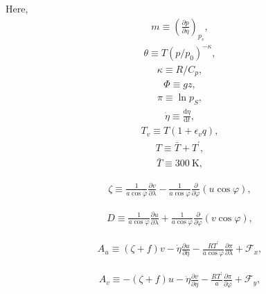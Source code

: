 Here, \begin{eqnarray}
m \equiv  \left(\frac{\partial p}{\partial \eta}\right)_{p_s},
\end{eqnarray} \begin{eqnarray}
\theta  \equiv   T \left( p/p_{0} \right)^{-\kappa},
\end{eqnarray} \begin{eqnarray}
\kappa  \equiv   R/C_{p},
\end{eqnarray} \begin{eqnarray}
\Phi  \equiv   gz,
\end{eqnarray} \begin{eqnarray}
\pi  \equiv   \ln p_{S},
\end{eqnarray} \begin{eqnarray}
\dot{\eta}  \equiv    \frac{\mathrm{d}\eta}{\mathrm{d}t},
\end{eqnarray} \begin{eqnarray}
T_v  \equiv   T ( 1+\epsilon_v q ),
\end{eqnarray} \begin{eqnarray}
T  \equiv   \bar{T} + T^{\prime},
\end{eqnarray} \begin{eqnarray}
\bar{T} \equiv 300 \ \mathrm{K},
\end{eqnarray}

\begin{eqnarray}
  \zeta  \equiv  \frac{1}{a \cos\varphi }
  \frac{\partial v}{\partial \lambda}
    -  \frac{1}{a \cos\varphi }
  \frac{\partial }{\partial \varphi}
  ( u \cos\varphi ),
\end{eqnarray}

\begin{eqnarray}
  D  \equiv \frac{1}{a \cos\varphi }
  \frac{\partial u}{\partial \lambda}
      + \frac{1}{a \cos\varphi }
  \frac{\partial }{\partial \varphi}
    ( v \cos\varphi ),
\end{eqnarray}

\begin{eqnarray}
  A_u  \equiv ( \zeta + f ) v
    - \dot{\eta} \frac{\partial u}{\partial \eta}
    - \frac{RT^{\prime}}{a\cos\varphi}
  \frac{\partial \pi}{\partial \lambda}
    + {\mathcal F}_x,
\end{eqnarray}

\begin{eqnarray}
  A_v  \equiv - ( \zeta + f ) u
    - \dot{\eta} \frac{\partial v}{\partial \eta}
    - \frac{RT^{\prime}}{a}
  \frac{\partial \pi}{\partial \varphi}
    + {\mathcal F}_y,
\end{eqnarray}

